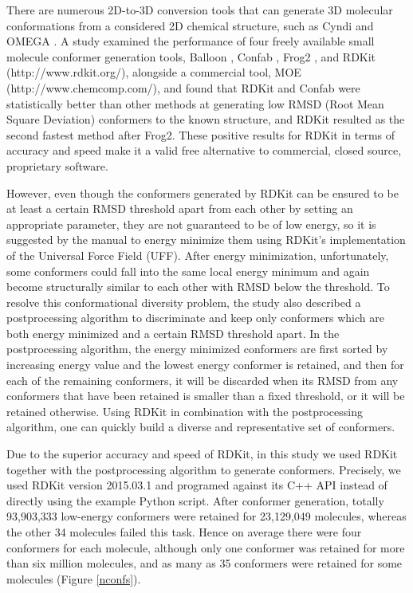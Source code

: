 \documentclass[a4,center,fleqn]{NAR}
\begin{document}
There are numerous 2D-to-3D conversion tools that can generate 3D molecular conformations from a considered 2D chemical structure, such as Cyndi \cite{1393,1394} and OMEGA \cite{462}. A study \cite{1127} examined the performance of four freely available small molecule conformer generation tools, Balloon \cite{1442}, Confab \cite{1443}, Frog2 \cite{1444}, and RDKit (http://www.rdkit.org/), alongside a commercial tool, MOE (http://www.chemcomp.com/), and found that RDKit and Confab were statistically better than other methods at generating low RMSD (Root Mean Square Deviation) conformers to the known structure, and RDKit resulted as the second fastest method after Frog2. These positive results for RDKit in terms of accuracy and speed make it a valid free alternative to commercial, closed source, proprietary software.

However, even though the conformers generated by RDKit can be ensured to be at least a certain RMSD threshold apart from each other by setting an appropriate parameter, they are not guaranteed to be of low energy, so it is suggested by the manual to energy minimize them using RDKit's implementation of the Universal Force Field (UFF). After energy minimization, unfortunately, some conformers could fall into the same local energy minimum and again become structurally similar to each other with RMSD below the threshold. To resolve this conformational diversity problem, the study \cite{1127} also described a postprocessing algorithm to discriminate and keep only conformers which are both energy minimized and a certain RMSD threshold apart. In the postprocessing algorithm, the energy minimized conformers are first sorted by increasing energy value and the lowest energy conformer is retained, and then for each of the remaining conformers, it will be discarded when its RMSD from any conformers that have been retained is smaller than a fixed threshold, or it will be retained otherwise. Using RDKit in combination with the postprocessing algorithm, one can quickly build a diverse and representative set of conformers.

Due to the superior accuracy and speed of RDKit, in this study we used RDKit together with the postprocessing algorithm to generate conformers. Precisely, we used RDKit version 2015.03.1 and programed against its C++ API instead of directly using the example Python script. After conformer generation, totally 93,903,333 low-energy conformers were retained for 23,129,049 molecules, whereas the other 34 molecules failed this task. Hence on average there were four conformers for each molecule, although only one conformer was retained for more than six million molecules, and as many as 35 conformers were retained for some molecules (Figure \ref{nconfs}).
\end{document}
